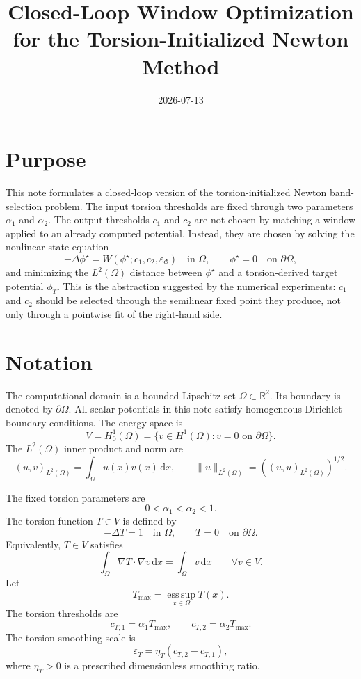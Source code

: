 \documentclass[11pt]{article}
\title{Closed-Loop Window Optimization for the Torsion-Initialized Newton Method}
\author{}
\date{2026-07-13}
\newcommand{\dd}{\,\mathrm d}
\newcommand{\R}{\mathbb R}
\newcommand{\OmegaD}{\Omega}
\newcommand{\V}{V}
\newcommand{\W}{W}
\newcommand{\phistar}{\phi^\star}
\newcommand{\phit}{\phi_T}
\newcommand{\epsT}{\varepsilon_T}
\newcommand{\epsp}{\varepsilon_\Phi}
\newcommand{\Honez}{H^1_0(\OmegaD)}
\begin{document}
\maketitle

\section{Purpose}

This note formulates a closed-loop version of the torsion-initialized Newton
band-selection problem.  The input torsion thresholds are fixed through two parameters
\(\alpha_1\) and \(\alpha_2\).  The output thresholds \(c_1\) and \(c_2\)
are not chosen by matching a window applied to an already computed potential.
Instead, they are chosen by solving the nonlinear state equation
\[
  -\Delta \phistar = \W(\phistar;c_1,c_2,\epsp)
  \quad \text{in } \OmegaD,
  \qquad
  \phistar = 0
  \quad \text{on } \partial\OmegaD,
\]
and minimizing the \(L^2(\OmegaD)\) distance between \(\phistar\) and a
torsion-derived target potential \(\phit\).  This is the abstraction suggested
by the numerical experiments: \(c_1\) and \(c_2\) should be selected through
the semilinear fixed point they produce, not only through a pointwise fit of
the right-hand side.

\section{Notation}

The computational domain is a bounded Lipschitz set
\(\OmegaD\subset\R^2\).  Its boundary is denoted by \(\partial\OmegaD\).
All scalar potentials in this note satisfy homogeneous Dirichlet boundary
conditions.  The energy space is
\[
  \V = \Honez
  =
  \{v\in H^1(\OmegaD): v=0 \text{ on } \partial\OmegaD\}.
\]
The \(L^2(\OmegaD)\) inner product and norm are
\[
  (u,v)_{L^2(\OmegaD)}
  =
  \int_{\OmegaD} u(x)v(x)\dd x,
  \qquad
  \|u\|_{L^2(\OmegaD)}
  =
  \left((u,u)_{L^2(\OmegaD)}\right)^{1/2}.
\]

The fixed torsion parameters are
\[
  0<\alpha_1<\alpha_2<1.
\]
The torsion function \(T\in \V\) is defined by
\[
  -\Delta T = 1
  \quad \text{in } \OmegaD,
  \qquad
  T=0
  \quad \text{on } \partial\OmegaD.
\]
Equivalently, \(T\in\V\) satisfies
\[
  \int_{\OmegaD}\nabla T\cdot\nabla v\dd x
  =
  \int_{\OmegaD} v\dd x
  \qquad
  \forall v\in\V.
\]
Let
\[
  T_{\max} = \operatorname*{ess\,sup}_{x\in\OmegaD} T(x).
\]
The torsion thresholds are
\[
  c_{T,1} = \alpha_1 T_{\max},
  \qquad
  c_{T,2} = \alpha_2 T_{\max}.
\]
The torsion smoothing scale is
\[
  \epsT = \eta_T(c_{T,2}-c_{T,1}),
\]
where \(\eta_T>0\) is a prescribed dimensionless smoothing ratio.
\end{document}
